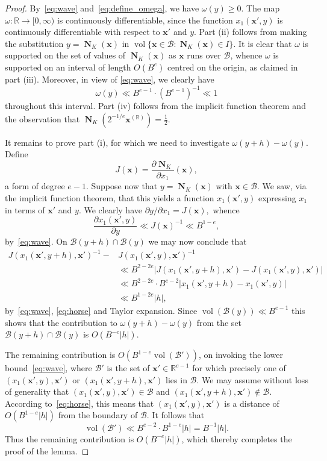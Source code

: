 \documentclass[11pt,letterpaper]{amsart}
\renewcommand{\geq}{\geqslant}
\theoremstyle{definition}
\numberwithin{equation}{section}
\newcommand\RR{\mathbb{R}}
\newcommand{\x}{\mathbf{x}}
\DeclareMathOperator{\vol}{vol}
\DeclareMathOperator{\nf}{\mathbf{N}}
\newcommand{\0}{\mathbf{0}}
\begin{document}
\begin{proof}
By~\eqref{eq:wave} and~\eqref{eq:define_omega}, we have $\omega(y)\geq 0$. The map $\omega:\RR\to [0,\infty)$ is 
continuously differentiable, since the function $x_1(\x',y)$ is 
continuously differentiable with respect to $\x'$ and $y$.
Part (ii) follows from making the substitution $y=\nf_K(\x)$ in 
$\vol\{
\x\in \mathcal{B}: \nf_K(\x)\in I\}$.
It is clear  that  $\omega$ is supported on the set of values
of $\nf_K(\x)$ as $\x$ runs over $\mathcal{B}$, whence 
$\omega$ is supported on an interval of length $O(B^e)$ centred on the origin, as claimed in 
part (iii). Moreover, in view of 
\eqref{eq:wave}, we clearly have 
$$\omega(y)\ll B^{e-1}\cdot (B^{e-1})^{-1}\ll 1
$$ throughout this interval.
Part (iv) follows from the implicit function theorem and the observation that 
$ \nf_{K}(2^{-1/e}\x^{(\RR)})=\frac{1}{2}$.

It remains to prove part (i),
for which we need to investigate $\omega(y+h)-\omega(y)$.  
Define 
$$
J(\x)=
\frac{\partial \nf_K}{\partial x_1}(\x),
$$ 
a form of degree $e-1$. 
Suppose now that $y=\nf_K(\x)$ with $\x\in \mathcal{B}$. We saw, via the implicit function theorem, that this  yields a function $x_1(\x',y)$ expressing $x_1$ in terms of 
$\x'$ and $y$. We clearly have 
$
\partial y/\partial x_1=J(\x),
$ whence
\begin{equation}\label{eq:horse}
\frac{\partial x_1(\x',y)}{\partial y}\ll J(\x)^{-1}\ll B^{1-e},
\end{equation}
by~\eqref{eq:wave}.
On $\mathcal{B}(y+h)\cap
\mathcal{B}(y)$ 
we may now conclude that 
\begin{align*}
J(x_1(\x',y+h),\x')^{-1}-&J(x_1(\x',y),\x')^{-1}\\ 
&\ll B^{2-2e}
|J(x_1(\x',y+h),\x')-J(x_1(\x',y),\x')| \\
&\ll B^{2-2e} \cdot B^{e-2}
|x_1(\x',y+h) -x_1(\x',y)|\\
&\ll B^{1-2e}|h|,
\end{align*}
by~\eqref{eq:wave}, 
\eqref{eq:horse}
 and Taylor expansion.
Since $\vol(\mathcal{B}(y))\ll B^{e-1}$ this shows that 
the contribution to $\omega(y+h)-\omega(y)$ from the set
 $\mathcal{B}(y+h)\cap
\mathcal{B}(y)$ is $O(B^{-e}|h|)$.


The remaining contribution is 
$O(B^{1-e}\vol(\mathcal{B}'))$, 
on invoking the lower bound~\eqref{eq:wave}, 
where
$\mathcal{B}'$ is the set of $\x'\in \RR^{e-1}$ for which precisely one of 
$(x_1(\x',y),\x')$ or $(x_1(\x',y+h),\x')$ lies in $ \mathcal{B}$.
We may assume without loss of generality that 
$(x_1(\x',y),\x')\in \mathcal{B}$ and  $(x_1(\x',y+h),\x')\not\in \mathcal{B}$.
According to~\eqref{eq:horse}, this means that 
$(x_1(\x',y),\x')$ is a distance of $O(B^{1-e}|h|)$ from the boundary of 
$\mathcal{B}$. It follows  that 
$$
\vol(\mathcal{B}') \ll B^{e-2}\cdot B^{1-e}|h|=B^{-1}|h|.
$$
Thus the remaining contribution is $O(B^{-e}|h|)$, which thereby completes the proof of the lemma.
\end{proof}
\end{document}
